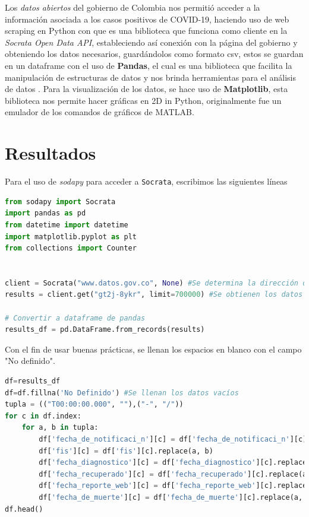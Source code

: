 \documentclass[conference,compsoc,onecolumn]{IEEEtran}
\begin{document}
Los \textit{datos abiertos} del gobierno de Colombia nos permitió acceder a la información asociada a los casos positivos de COVID-19, haciendo uso de web scraping en Python con  que es una biblioteca que funciona como cliente en la \textit{Socrata Open Data API}, estableciendo así conexión con la página del gobierno y obteniendo los datos necesarios, guardándolos como formato csv, estos se guardan en un dataframe con el uso de \textbf{Pandas}, el cual es una biblioteca que facilita la manipulación de estructuras de datos y nos brinda herramientas para el análisis de datos \cite{Pandas}. Para la visualización de los datos, se hace uso de \textbf{Matplotlib}, esta biblioteca nos permite hacer gráficas en 2D in Python, originalmente fue un emulador de los comandos de gráficos de MATLAB.

\section{Resultados}
\label{sec:results}
Para el uso de \textit{sodapy} para acceder a \texttt{Socrata}, escribimos las siguientes líneas

\begin{lstlisting}[language=python]
from sodapy import Socrata
import pandas as pd
from datetime import datetime
import matplotlib.pyplot as plt
from collections import Counter


client = Socrata("www.datos.gov.co", None) #Se determina la dirección de la cual se extraerán los datos
results = client.get("gt2j-8ykr", limit=700000) #Se obtienen los datos y se establece un límite

# Convertir a dataframe de pandas
results_df = pd.DataFrame.from_records(results)
\end{lstlisting}

Con el fin de usar buenas prácticas, se llenan los espacios en blanco con el campo "No definido".

\begin{lstlisting}[language=python]
df=results_df
df=df.fillna('No Definido') #Se llenan los datos vacíos
tupla = (("T00:00:00.000", ""),("-", "/"))
for c in df.index:
    for a, b in tupla:
        df['fecha_de_notificaci_n'][c] = df['fecha_de_notificaci_n'][c].replace(a, b)
        df['fis'][c] = df['fis'][c].replace(a, b)
        df['fecha_diagnostico'][c] = df['fecha_diagnostico'][c].replace(a, b)
        df['fecha_recuperado'][c] = df['fecha_recuperado'][c].replace(a, b)
        df['fecha_reporte_web'][c] = df['fecha_reporte_web'][c].replace(a, b)
        df['fecha_de_muerte'][c] = df['fecha_de_muerte'][c].replace(a, b)
df.head()
\end{lstlisting}
\end{document}
